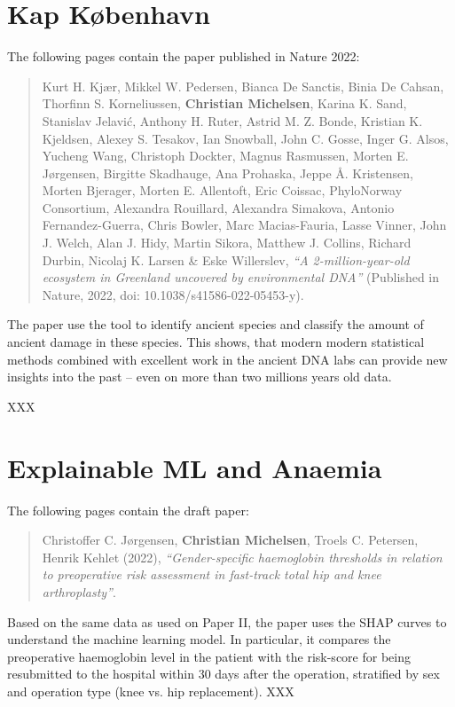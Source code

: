 
\chapter{Kap København}
\label{appendix:kapk}

The following pages contain the paper published in Nature 2022:

\begin{quote}
    Kurt H. Kjær, Mikkel W. Pedersen, Bianca De Sanctis, Binia De Cahsan, Thorfinn S. Korneliussen, \textbf{Christian Michelsen}, Karina K. Sand, Stanislav Jelavić, Anthony H. Ruter, Astrid M. Z. Bonde, Kristian K. Kjeldsen, Alexey S. Tesakov, Ian Snowball, John C. Gosse, Inger G. Alsos, Yucheng Wang, Christoph Dockter, Magnus Rasmussen, Morten E. Jørgensen, Birgitte Skadhauge, Ana Prohaska, Jeppe Å. Kristensen, Morten Bjerager, Morten E. Allentoft, Eric Coissac, PhyloNorway Consortium, Alexandra Rouillard, Alexandra Simakova, Antonio Fernandez-Guerra, Chris Bowler, Marc Macias-Fauria, Lasse Vinner, John J. Welch, Alan J. Hidy, Martin Sikora, Matthew J. Collins, Richard Durbin, Nicolaj K. Larsen \& Eske Willerslev, \emph{``A 2-million-year-old ecosystem in Greenland uncovered by environmental DNA''} (Published in Nature, 2022, doi: 10.1038/s41586-022-05453-y).
\end{quote}
The paper use the \metaDMG tool to identify ancient species and classify the amount of ancient damage in these species.  This shows, that modern modern statistical methods combined with excellent work in the ancient DNA labs can provide new insights into the past -- even on more than two millions years old data.

\clearpage
% 
XXX



\chapter{Explainable ML and Anaemia}
\label{appendix:anaemia}

The following pages contain the draft paper:

\begin{quote}
    Christoffer C. Jørgensen, \textbf{Christian Michelsen}, Troels C. Petersen, Henrik Kehlet (2022), \emph{``Gender-specific haemoglobin thresholds in relation to preoperative risk assessment in fast-track total hip and knee arthroplasty''}.
\end{quote}
Based on the same data as used on Paper II, the paper uses the SHAP curves to understand the machine learning model. In particular, it compares the preoperative haemoglobin level in the patient with the risk-score for being resubmitted to the hospital within 30 days after the operation, stratified by sex and operation type (knee vs. hip replacement).
\clearpage
% 
XXX



